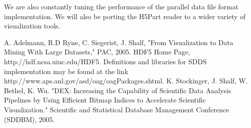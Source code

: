 \documentclass[acus]{JAC2003}
\begin{document}
We are also constantly tuning the performance of the parallel data
file format implementation.  We will also be porting the H5Part reader
to a wider variety of visualization tools. 
\begin{thebibliography}{9}   %
A. Adelmann, R.D Ryne, C. Siegerist, J. Shalf, "From Visualization to Data Mining With Large Datasets," PAC, 2005.
HDF5 Home Page, http://hdf.ncsa.uiuc.edu/HDF5.
Definitions and libraries for SDDS implementation may be found at the link http://www.aps.anl.gov/asd/oag/oagPackages.shtml.
K. Stockinger, J. Shalf, W. Bethel, K. Wu. "DEX: Increasing the Capability of Scientific Data Analysis Pipelines by Using Efficient Bitmap Indices to Accelerate Scientific Visualization." Scientific and Statistical Database Management Conference (SDDBM), 2005.
\end{thebibliography}
\end{document}
